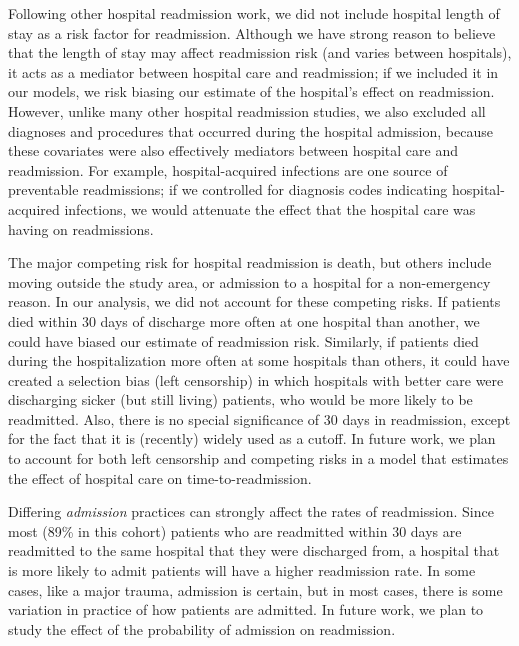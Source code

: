 \documentclass[]{article}\usepackage[]{graphicx}\usepackage[]{color}
\begin{document}
Following other hospital readmission work, we did not include hospital length of stay as a risk factor for readmission. Although we have strong reason to believe that the length of stay may affect readmission risk (and varies between hospitals), it acts as a mediator between hospital care and readmission; if we included it in our models, we risk biasing our estimate of the hospital's effect on readmission. However, unlike many other hospital readmission studies, we also excluded all diagnoses and procedures that occurred during the hospital admission, because these covariates were also effectively mediators between hospital care and readmission. For example, hospital-acquired infections are one source of preventable readmissions; if we controlled for diagnosis codes indicating hospital-acquired infections, we would attenuate the effect that the hospital care was having on readmissions.

The major competing risk for hospital readmission is death, but others include moving outside the study area, or admission to a hospital for a non-emergency reason. In our analysis, we did not account for these competing risks. If patients died within 30 days of discharge more often at one hospital than another, we could have biased our estimate of readmission risk. Similarly, if patients died during the hospitalization more often at some hospitals than others, it could have created a selection bias (left censorship) in which hospitals with better care were discharging sicker (but still living) patients, who would be more likely to be readmitted. Also, there is no special significance of 30 days in readmission, except for the fact that it is (recently) widely used as a cutoff. In future work, we plan to account for both left censorship and competing risks in a model that estimates the effect of hospital care on time-to-readmission.

Differing \emph{admission} practices can strongly affect the rates of readmission. Since most  (89\% in this cohort) patients who are readmitted within 30 days are readmitted to the same hospital that they were discharged from, a hospital that is more likely to admit patients will have a higher readmission rate. In some cases, like a major trauma, admission is certain, but in most cases, there is some variation in practice of how patients are admitted. In future work, we plan to study the effect of the probability of admission on readmission.
\end{document}
